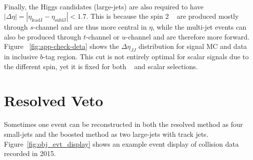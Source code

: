 \paragraph{}
Finally, the Higgs candidates (large-\R jets) are also required to have $|\Delta\eta| = |\eta_{\text{leadJ}} -\eta_{\text{sublJ}} |< 1.7$. 
This is because the spin 2 \Grav~ are produced mostly through $s$-channel and are thus more central in $\eta$, while the multi-jet events can also be produced through $t$-channel or $u$-channel and are therefore more forward. 
Figure ~\ref{fig:app-check-deta} shows the $\Delta \eta_{JJ}$ distribution for signal MC and data in inclusive $b$-tag region.
This cut is not entirely optimal for scalar signals due to the different spin, yet it is fixed for both \Grav~ and scalar selections.



\section{Resolved Veto}
\label{sec:resollvedveto}

\paragraph{}
Sometimes one event can be reconstructed in both the resolved method as four small-\R jets and the boosted method as two large-\R jets with track jets. Figure~\ref{fig:obj_evt_display} shows an example event display of collision data recorded in 2015.

